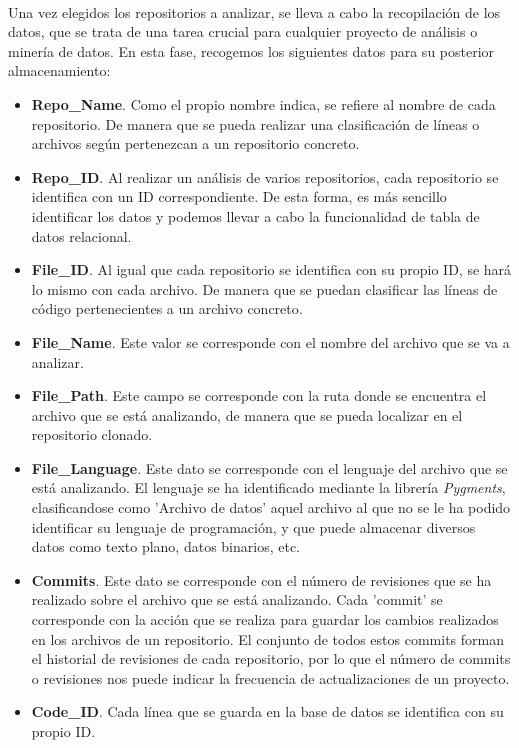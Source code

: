 \documentclass[a4paper, 12pt]{book}
\begin{document}
\\Una vez elegidos los repositorios a analizar, se lleva a cabo la recopilación de los datos, que se trata de una tarea crucial para cualquier proyecto de análisis o minería de datos. En esta fase, recogemos los siguientes datos para su posterior 
almacenamiento:

\begin{itemize}
  \item \textbf{Repo\_Name}. Como el propio nombre indica, se refiere al nombre de cada repositorio. De manera que se pueda realizar una clasificación de líneas o archivos según pertenezcan a un repositorio concreto.
  \item \textbf{Repo\_ID}. Al realizar un análisis de varios repositorios, cada repositorio se identifica con un ID correspondiente. De esta forma, es más sencillo identificar los datos y podemos llevar a cabo la funcionalidad
  de tabla de datos relacional.
  \item \textbf{File\_ID}. Al igual que cada repositorio se identifica con su propio ID, se hará lo mismo con cada archivo. De manera que se puedan clasificar las líneas de código pertenecientes a un archivo concreto.
  \item \textbf{File\_Name}. Este valor se corresponde con el nombre del archivo que se va a analizar.
  \item \textbf{File\_Path}. Este campo se corresponde con la ruta donde se encuentra el archivo que se está analizando, de manera que se pueda localizar en el repositorio clonado.
  \item \textbf{File\_Language}. Este dato se corresponde con el lenguaje del archivo que se está analizando. El lenguaje se ha identificado mediante la librería \textit{Pygments}, clasificandose como 'Archivo de datos' aquel
  archivo al que no se le ha podido identificar su lenguaje de programación, y que puede almacenar diversos datos como texto plano, datos binarios, etc. 
  \item \textbf{Commits}. Este dato se corresponde con el número de revisiones que se ha realizado sobre el archivo que se está analizando. Cada 'commit' se corresponde con la acción que se realiza para guardar los cambios realizados en los archivos de 
  un repositorio. El conjunto de todos estos commits forman el historial de revisiones de cada repositorio, por lo que el número de commits o revisiones nos puede indicar la frecuencia de actualizaciones de un proyecto.
  \item \textbf{Code\_ID}. Cada línea que se guarda en la base de datos se identifica con su propio ID.

\end{itemize}
\end{document}
